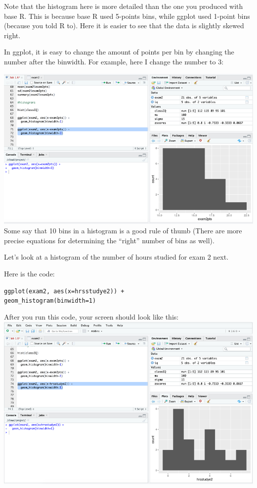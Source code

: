 \documentclass[
]{book}
\begin{document}
Note that the histogram here is more detailed than the one you produced with base R. This is because base R used 5-points bins, while ggplot used 1-point bins (because you told R to). Here it is easier to see that the data is slightly skewed right.

In ggplot, it is easy to change the amount of points per bin by changing the number after the binwidth. For example, here I change the number to 3:

\includegraphics{img/tidyhist2.png}
Some say that 10 bins in a histogram is a good rule of thumb (There are more precise equations for determining the ``right'' number of bins as well).

Let's look at a histogram of the number of hours studied for exam 2 next.

Here is the code:

\texttt{ggplot(exam2,\ aes(x=hrsstudye2))\ +}\\
\texttt{geom\_histogram(binwidth=1)}

After you run this code, your screen should look like this:\\
\includegraphics{img/tidyhist3.png}
\end{document}
